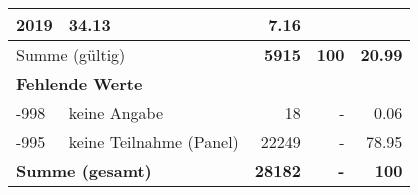 \begin{longtable}{lXrrr}
       \num{2019} &
       \num[round-mode=places,round-precision=2]{34.13} &
         \num[round-mode=places,round-precision=2]{7.16} \\
     \midrule
     \multicolumn{2}{l}{Summe (gültig)} &
       \textbf{\num{5915}} &
     \textbf{\num{100}} &
       \textbf{\num[round-mode=places,round-precision=2]{20.99}} \\
     \multicolumn{5}{l}{\textbf{Fehlende Werte}}\\
       -998 &
       keine Angabe &
         \num{18} &
        - &
         \num[round-mode=places,round-precision=2]{0.06} \\
       -995 &
       keine Teilnahme (Panel) &
         \num{22249} &
        - &
         \num[round-mode=places,round-precision=2]{78.95} \\
     \midrule
     \multicolumn{2}{l}{\textbf{Summe (gesamt)}} &
          \textbf{\num{28182}} &
        \textbf{-} &
        \textbf{\num{100}} \\
     \bottomrule
     \end{longtable}
     
